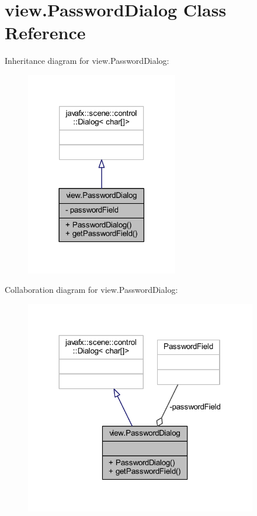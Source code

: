 \hypertarget{classview_1_1_password_dialog}{}\section{view.\+Password\+Dialog Class Reference}
\label{classview_1_1_password_dialog}


Inheritance diagram for view.\+Password\+Dialog\+:\nopagebreak
\begin{figure}[H]
\begin{center}
\leavevmode
\includegraphics[width=189pt]{classview_1_1_password_dialog__inherit__graph}
\end{center}
\end{figure}


Collaboration diagram for view.\+Password\+Dialog\+:\nopagebreak
\begin{figure}[H]
\begin{center}
\leavevmode
\includegraphics[width=288pt]{classview_1_1_password_dialog__coll__graph}
\end{center}
\end{figure}
